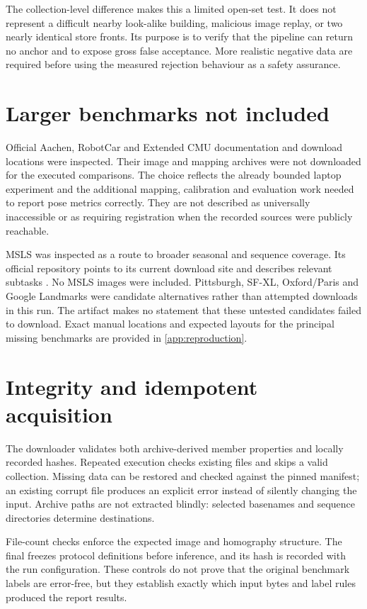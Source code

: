 The collection-level difference makes this a limited open-set test. It does not represent a difficult nearby look-alike building, malicious image replay, or two nearly identical store fronts. Its purpose is to verify that the pipeline can return no anchor and to expose gross false acceptance. More realistic negative data are required before using the measured rejection behaviour as a safety assurance.

\ifFullReport
\section{Larger benchmarks not included}
Official Aachen, RobotCar and Extended CMU documentation and download locations were inspected. Their image and mapping archives were not downloaded for the executed comparisons. The choice reflects the already bounded laptop experiment and the additional mapping, calibration and evaluation work needed to report pose metrics correctly. They are not described as universally inaccessible or as requiring registration when the recorded sources were publicly reachable.

MSLS was inspected as a route to broader seasonal and sequence coverage. Its official repository points to its current download site and describes relevant subtasks \citep{warburg2020}. No MSLS images were included. Pittsburgh, SF-XL, Oxford/Paris and Google Landmarks were candidate alternatives rather than attempted downloads in this run. The artifact makes no statement that these untested candidates failed to download. Exact manual locations and expected layouts for the principal missing benchmarks are provided in \cref{app:reproduction}.
\fi

\section{Integrity and idempotent acquisition}
The downloader validates both archive-derived member properties and locally recorded hashes. Repeated execution checks existing files and skips a valid collection. Missing data can be restored and checked against the pinned manifest; an existing corrupt file produces an explicit error instead of silently changing the input. Archive paths are not extracted blindly: selected basenames and sequence directories determine destinations.

File-count checks enforce the expected image and homography structure. The final  freezes protocol definitions before inference, and its hash is recorded with the run configuration. These controls do not prove that the original benchmark labels are error-free, but they establish exactly which input bytes and label rules produced the report results.
